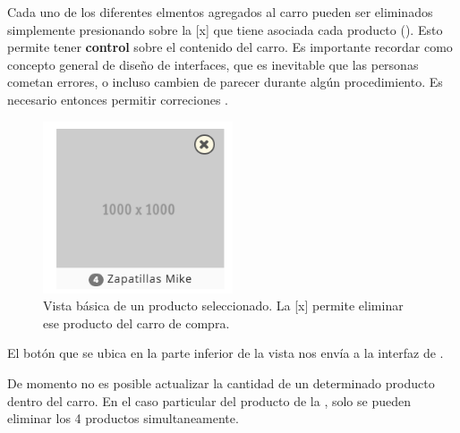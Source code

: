 		Cada uno de los diferentes elmentos agregados al carro pueden ser eliminados simplemente presionando sobre la [x] que tiene asociada cada producto (). Esto permite tener \textbf{control} sobre el contenido del carro. Es importante recordar como concepto general de diseño de interfaces, que es inevitable que las personas cometan errores, o incluso cambien de parecer durante algún procedimiento. Es necesario entonces permitir correciones \cite{online_goodgui_org}. 

		\begin{figure}[H]
			\centering
			\includegraphics[width=0.5\textwidth]{figuras/solution/cart/producto.png}
			\caption{Vista básica de un producto seleccionado. La [x] permite eliminar ese producto del carro de compra.}
			\label{figure:solution:cart:product}
		\end{figure}

		El botón \checkoutNowLABEL que se ubica en la parte inferior de la vista  nos envía a la interfaz de .

		De momento no es posible actualizar la cantidad de un determinado producto dentro del carro. En el caso particular del producto de la , solo se pueden eliminar los 4 productos simultaneamente.


